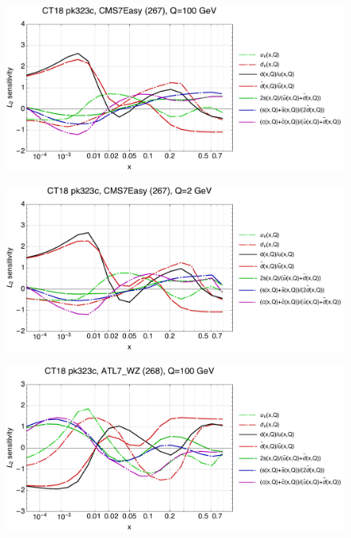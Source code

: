 \documentclass[10pt,aps,prd,floatfix,titlepage]{revtex4}
\begin{document}
\clearpage
\begin{figure}
\includegraphics[width=\textwidth,height=0.44\textheight,keepaspectratio]{2/267_ct18nn_q100_Sf_2.pdf}
\caption{}
\end{figure}
\begin{figure}
\includegraphics[width=\textwidth,height=0.44\textheight,keepaspectratio]{2/267_ct18nn_q2_Sf_2.pdf}
\caption{}
\end{figure}
\clearpage
\begin{figure}
\includegraphics[width=\textwidth,height=0.44\textheight,keepaspectratio]{2/268_ct18nn_q100_Sf_2.pdf}
\caption{}
\end{figure}
\end{document}
